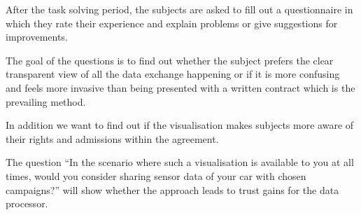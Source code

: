 \documentclass[../paper.tex]{subfiles}
\begin{document}
  After the task solving period, the subjects are asked to fill out a
  questionnaire in which they rate their experience and explain problems or
  give suggestions for improvements.

  The goal of the questions is to find out whether the subject prefers the clear
  transparent view of all the data exchange happening or if it is more confusing
  and feels more invasive than being presented with a written contract which 
  is the prevailing method.

  In addition we want to find out if the visualisation makes subjects more
  aware of their rights and admissions within the agreement.

  The question “In the scenario where such a visualisation is available to you
  at all times, would you consider sharing sensor data of your car with chosen
  campaigns?” will show whether the approach leads to trust gains for the data
  processor.
\end{document}
